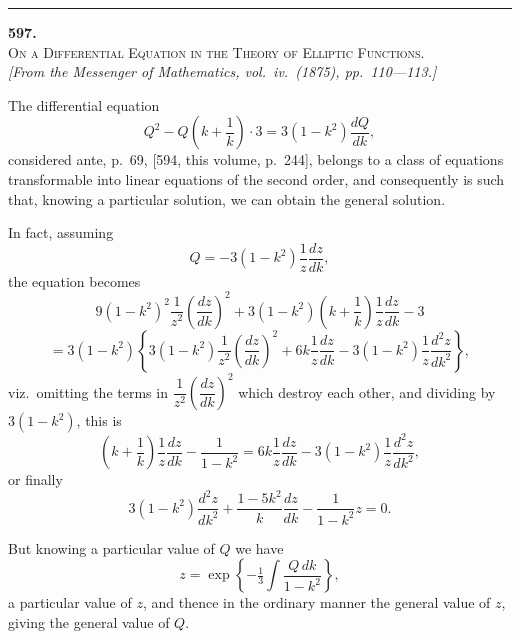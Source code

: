 \documentclass[11pt]{article}
\begin{document}
\bigskip
\hrule
\bigskip


\begin{center}
{\large\textbf{597.}}\\[4pt]
{\scshape On a Differential Equation in the Theory of Elliptic Functions.}\\[4pt]
\textit{[From the \textit{Messenger of Mathematics}, vol.\ iv.\ (1875), pp.\ 110---113.]}
\end{center}

\medskip

The differential equation
\[
Q^{2}-Q\!\left(k+\frac{1}{k}\right)\cdot 3=3(1-k^{2})\frac{dQ}{dk},
\]
considered ante, p.\ 69, [594, this volume, p.\ 244], belongs to a class of equations
transformable into linear equations of the second order, and consequently is such
that, knowing a particular solution, we can obtain the general solution.

In fact, assuming
\[
Q=-3(1-k^{2})\frac{1}{z}\frac{dz}{dk},
\]
the equation becomes
\[
9(1-k^{2})^{2}\!\frac{1}{z^{2}}\!\left(\frac{dz}{dk}\right)^{2}+3(1-k^{2})\!\left(k+\frac{1}{k}\right)\frac{1}{z}\frac{dz}{dk}-3
\]
\[
=3(1-k^{2})\!\left\{3(1-k^{2})\frac{1}{z^{2}}\!\left(\frac{dz}{dk}\right)^{2}+6k\frac{1}{z}\frac{dz}{dk}-3(1-k^{2})\frac{1}{z}\frac{d^{2}z}{dk^{2}}\right\},
\]
viz.\ omitting the terms in $\dfrac{1}{z^{2}}\!\left(\dfrac{dz}{dk}\right)^{2}$ which destroy each
other, and dividing by $3(1-k^{2})$, this is
\[
\!\left(k+\frac{1}{k}\right)\frac{1}{z}\frac{dz}{dk}-\frac{1}{1-k^{2}}=6k\frac{1}{z}\frac{dz}{dk}-3(1-k^{2})\frac{1}{z}\frac{d^{2}z}{dk^{2}},
\]
or finally
\[
3(1-k^{2})\frac{d^{2}z}{dk^{2}}+\frac{1-5k^{2}}{k}\frac{dz}{dk}-\frac{1}{1-k^{2}}z=0.
\]

But knowing a particular value of $Q$ we have
\[
z=\exp\!\left\{-\tfrac{1}{3}\!\int\!\frac{Q\,dk}{1-k^{2}}\right\},
\]
a particular value of $z$, and thence in the ordinary manner the general value of $z$,
giving the general value of $Q$.
\end{document}
